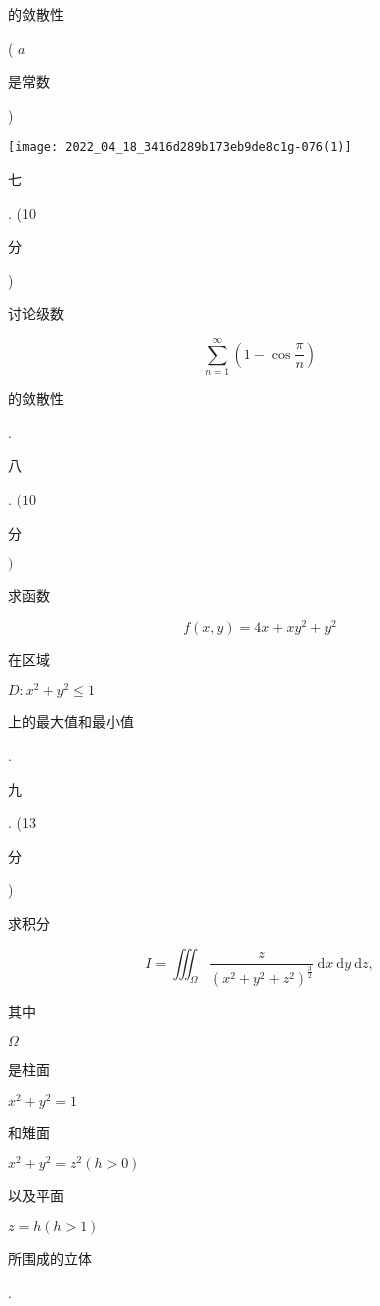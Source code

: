\documentclass[10pt]{article}
\begin{document}
\begin{CJK}{UTF8}{mj}的敛散性\end{CJK} ( $a$ \begin{CJK}{UTF8}{mj}是常数\end{CJK})

\texttt{[image: 2022\_04\_18\_3416d289b173eb9de8c1g-076(1)]}

\begin{CJK}{UTF8}{mj}七\end{CJK}. (10 \begin{CJK}{UTF8}{mj}分\end{CJK}) \begin{CJK}{UTF8}{mj}讨论级数\end{CJK}
$$
\sum_{n=1}^{\infty}\left(1-\cos \frac{\pi}{n}\right)
$$
\begin{CJK}{UTF8}{mj}的敛散性\end{CJK}.

\begin{CJK}{UTF8}{mj}八\end{CJK}. $(10$ \begin{CJK}{UTF8}{mj}分\end{CJK} $)$ \begin{CJK}{UTF8}{mj}求函数\end{CJK}
$$
f(x, y)=4 x+x y^{2}+y^{2}
$$
\begin{CJK}{UTF8}{mj}在区域\end{CJK} $D: x^{2}+y^{2} \leqslant 1$ \begin{CJK}{UTF8}{mj}上的最大值和最小值\end{CJK}.

\begin{CJK}{UTF8}{mj}九\end{CJK}. (13 \begin{CJK}{UTF8}{mj}分\end{CJK}) \begin{CJK}{UTF8}{mj}求积分\end{CJK}
$$
I=\iiint_{\Omega} \frac{z}{\left(x^{2}+y^{2}+z^{2}\right)^{\frac{3}{2}}} \mathrm{~d} x \mathrm{~d} y \mathrm{~d} z,
$$
\begin{CJK}{UTF8}{mj}其中\end{CJK} $\Omega$ \begin{CJK}{UTF8}{mj}是柱面\end{CJK} $x^{2}+y^{2}=1$ \begin{CJK}{UTF8}{mj}和雉面\end{CJK} $x^{2}+y^{2}=z^{2}(h>0)$ \begin{CJK}{UTF8}{mj}以及平面\end{CJK} $z=h(h>1)$ \begin{CJK}{UTF8}{mj}所围成的立体\end{CJK}.
\end{document}
